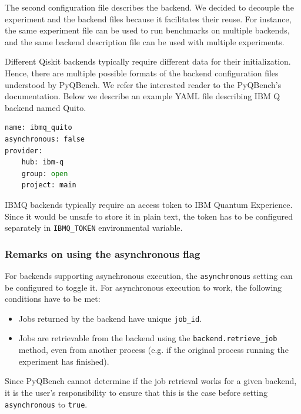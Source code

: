 \documentclass[preprint,12pt, a4paper, dvipsnames]{elsarticle}
\newcommand{\1}{{\rm 1\hspace{-0.9mm}l}}
\theoremstyle{definition}
\begin{document}
The second configuration file describes the backend. We decided to decouple the
experiment and the backend files because it facilitates their reuse. For instance, the same
experiment file can be used to run benchmarks on multiple backends, and the same backend description
file can be used with multiple experiments.

Different Qiskit backends typically require different data for their initialization. Hence, there
are multiple possible formats of the backend configuration files understood by PyQBench. We refer
the interested reader to the PyQBench's documentation. Below we describe an example YAML file
describing IBM Q backend named
Quito.
\begin{lstlisting}[language=Python, caption=IBMQ backend, label=lst:backend]
name: ibmq_quito
asynchronous: false
provider:
	hub: ibm-q
	group: open
	project: main
\end{lstlisting}
IBMQ backends typically require an access token to IBM Quantum Experience. Since it would be unsafe
to store it in plain text, the token has to be configured separately in \texttt{IBMQ\_TOKEN}
environmental variable.

\subsubsection{Remarks on using the asynchronous flag}
For backends supporting asynchronous execution, the \texttt{asynchronous} setting can be configured
to toggle it.
For asynchronous execution to work, the following conditions have to be met:
\begin{itemize}
\item Jobs returned by the backend have unique \texttt{job\_id}.
\item Jobs are retrievable from the backend using the \texttt{backend.retrieve\_job} method, even from another process (e.g. if the original process running the experiment has finished).
\end{itemize}
Since PyQBench cannot determine if the job retrieval works for a given backend, it is the user's
responsibility to ensure that this is the case before setting \texttt{asynchronous} to \texttt{true}.
\end{document}
